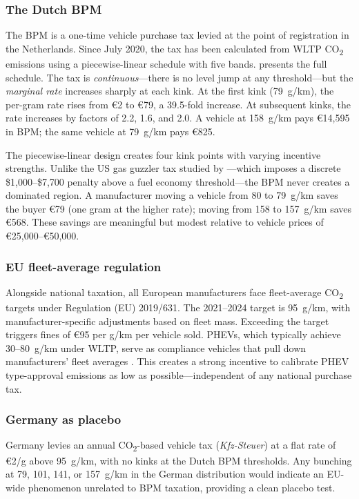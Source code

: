 \documentclass[12pt]{article}
\begin{document}
\subsubsection*{The Dutch BPM} The BPM is a one-time vehicle purchase tax levied at the point of registration in the Netherlands. Since July 2020, the tax has been calculated from WLTP CO\textsubscript{2} emissions using a piecewise-linear schedule with five bands.  presents the full schedule. The tax is \textit{continuous}---there is no level jump at any threshold---but the \textit{marginal rate} increases sharply at each kink. At the first kink (79~g/km), the per-gram rate rises from \euro 2 to \euro 79, a 39.5-fold increase. At subsequent kinks, the rate increases by factors of 2.2, 1.6, and 2.0. A vehicle at 158~g/km pays \euro 14,595 in BPM; the same vehicle at 79~g/km pays \euro 825.

The piecewise-linear design creates four kink points with varying incentive strengths. Unlike the US gas guzzler tax studied by \citet{sallee2012}---which imposes a discrete \$1,000--\$7,700 penalty above a fuel economy threshold---the BPM never creates a dominated region. A manufacturer moving a vehicle from 80 to 79~g/km saves the buyer \euro 79 (one gram at the higher rate); moving from 158 to 157~g/km saves \euro 568. These savings are meaningful but modest relative to vehicle prices of \euro 25,000--\euro 50,000.



\subsubsection*{EU fleet-average regulation} Alongside national taxation, all European manufacturers face fleet-average CO\textsubscript{2} targets under Regulation (EU) 2019/631. The 2021--2024 target is 95~g/km, with manufacturer-specific adjustments based on fleet mass. Exceeding the target triggers fines of \euro 95 per g/km per vehicle sold. PHEVs, which typically achieve 30--80~g/km under WLTP, serve as compliance vehicles that pull down manufacturers' fleet averages \citep{reynaert2021}. This creates a strong incentive to calibrate PHEV type-approval emissions as low as possible---independent of any national purchase tax.

\subsubsection*{Germany as placebo} Germany levies an annual CO\textsubscript{2}-based vehicle tax (\textit{Kfz-Steuer}) at a flat rate of \euro 2/g above 95~g/km, with no kinks at the Dutch BPM thresholds. Any bunching at 79, 101, 141, or 157~g/km in the German distribution would indicate an EU-wide phenomenon unrelated to BPM taxation, providing a clean placebo test.
\end{document}
